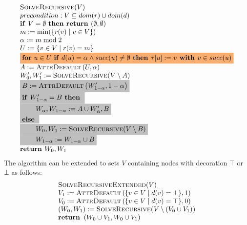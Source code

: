 \documentclass{article}
\newcommand{\If}{\text{\textbf{if }}}
\newcommand{\Then}{\text{\textbf{ then }}}
\newcommand{\Else}{\text{\textbf{else }}}
\newcommand{\Return}{\text{\textbf{return }}}
\newcommand{\With}{\text{\textbf{ with }}}
\begin{document}
\begin{equation*}
\begin{array}{l}
\textsc{SolveRecursive}(V) \\ 
precondition: V \subseteq dom(r) \cup dom(d) \\
\If V=\emptyset \text{ \textbf{then return }}(\emptyset
,\emptyset ) \\ 
m:=\min (\{r(v)\mid v\in V\}) \\ 
\alpha := m \bmod 2 \\ 
U:=\{v\in V\mid r(v)=m\} \\ 
\colorbox{Apricot}{$
\text{\textbf{for} }u\in U\text{ \textbf{if} }d(u)=\alpha \wedge succ(u)\neq
\emptyset \Then \tau \lbrack u]:=v\With v\in
succ(u) $}\\ 
A:=\text{\textsc{AttrDefault}}\left( U,\alpha \right)  \\ 
W_{0}^{\prime },W_{1}^{\prime }:=\text{\textsc{SolveRecursive(}}V\setminus A%
\text{)} \\
\colorbox{lightgray}{$
B:=\text{\textsc{AttrDefault}}\left( W_{1-\alpha }^{\prime },1-\alpha \right) $}\\ 
\colorbox{lightgray}{$
\If W_{1-\alpha }^{\prime }=B \Then $}\\ 
\colorbox{lightgray}{$
\qquad W_{\alpha },W_{1-\alpha }:=A\cup W_{\alpha }^{\prime },B $}\\ 
\colorbox{lightgray}{$
\Else $}\\ 
\colorbox{lightgray}{$
\qquad W_{0},W_{1}:=\textsc{SolveRecursive}(V \setminus B)$}\\ 
\colorbox{lightgray}{$
\qquad W_{1-\alpha }:=W_{1-\alpha }\cup B $}\\ 
\Return W_{0},W_{1}
\end{array}
\end{equation*}
The algorithm can be extended to sets $V$ containing nodes with decoration $%
\top $ or $\bot $ as follows:%
\begin{equation*}
\begin{array}{l}
\textsc{SolveRecursiveExtended}(V) \\ 
V_{1}:=\textsc{AttrDefault}\left( \{v\in V\mid d(v) = \bot \},1\right) \\ 
V_{0}:=\textsc{AttrDefault}\left( \{v\in V\mid d(v) = \top \},0\right) \\ 
\left( W_{0},W_{1}\right) :=\text{\textsc{SolveRecursive(}}V\setminus
(V_{0}\cup V_{1})\text{\textsc{)}} \\ 
\Return \left( W_{0}\cup V_{1},W_{0}\cup V_{1}\right)%
\end{array}
\end{equation*}
\end{document}
